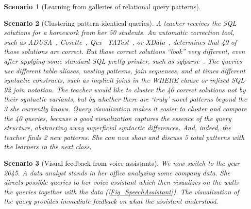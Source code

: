 \documentclass[letterpaper,11pt]{article}
\newtheorem{scenario}{Scenario}
\begin{document}
\begin{scenario}[Learning from galleries of relational query patterns]
	
	
	
%


	
\end{scenario}	


\begin{scenario}[Clustering pattern-identical queries]
	A teacher receives the SQL solutions for a homework from her 50 students. 
	An automatic correction tool, such as
	ADUSA~\cite{DBLP:conf/kbse/KhalekELK08},
	Cosette~\cite{DBLP:conf/cidr/ChuWWC17},
	Qex~\cite{DBLP:conf/lpar/VeanesTH10}
	TATest~\cite{MRJ:ExplainingWrongQueries:2019},
	or XData~\cite{DBLP:journals/vldb/ChandraCKRS015},
	determines that 40 of those solutions are correct. But those correct solutions ``look'' very different,
	even after applying some standard SQL pretty printer,
	such as sqlparse~\cite{sqlparse}.
	The queries use different table aliases, nesting patterns, join sequences, and at times different syntactic constructs, 
	such as
	implicit joins in the WHERE clause
	or infixed SQL-92 join notation.
	The teacher would like to cluster the 40 correct solutions not by their syntactic variants, but 
	by whether there
	are `truly' 
	\emph{novel patterns} beyond the 3 she currently knows.
	Query visualization makes it easier to cluster and compare the 40 queries, because a good visualization
	captures the essence of the query structure, abstracting away superficial
	syntactic differences.	
	And, indeed, the teacher finds 2 new patterns.
	She can now show and discuss 5 total patterns with the learners in the next class.
\end{scenario}	





\begin{scenario}[Visual feedback from voice assistants]
	\label{scenario:5}
	We now switch to the year 2045.
	A data analyst 
	stands in her office analyzing some company data. 
	She directs possible queries to her voice assistant 
	which then visualizes on the walls the queries 
	together with the data (\autoref{Fig_SpeechAssistant}). 
	The visualization of the query provides immediate feedback on what the assistant understood.
\end{scenario}
\end{document}
